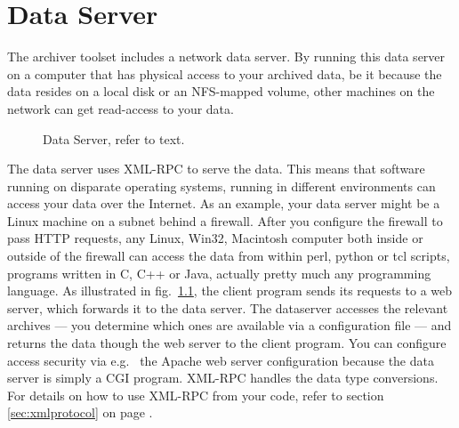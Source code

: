 \chapter{Data Server}
The archiver toolset includes a network data server.
By running this data server on a computer that has
physical access to your archived data, be it because the data resides
on a local disk or an NFS-mapped volume, other machines
on the network can get read-access to your data.

\begin{figure}[htb]
\begin{center}
\end{center}
\caption{\label{fig:dataserver}Data Server, refer to text.}
\end{figure}

\noindent The data server uses XML-RPC to serve the data. This means that
software running on disparate operating systems, running in different
environments can access your data over the Internet. As an example,
your data server might be a Linux machine on a subnet behind a
firewall. After you configure the firewall to pass HTTP requests, any
Linux, Win32, Macintosh computer both inside or outside of the
firewall can access the data from within perl, python or tcl scripts,
programs written in C, C++ or Java, actually pretty much any programming
language. As illustrated in fig.~\ref{fig:dataserver}, the client
program sends its requests to a web server, which forwards it to the
data server. The dataserver accesses the relevant archives --- you
determine which ones are available via a configuration file --- and
returns the data though the web server to the client program.  You can
configure access security via e.g.~ the Apache web server
configuration because the data server is simply a CGI program.
XML-RPC handles the data type conversions. For details on how to use
XML-RPC from your code, refer to section \ref{sec:xmlprotocol} on page
\pageref{sec:xmlprotocol}.

